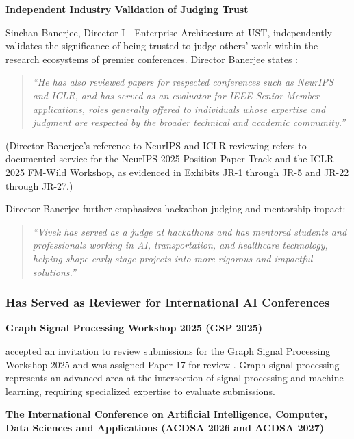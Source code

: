 \textbf{Independent Industry Validation of Judging Trust}

Sinchan Banerjee, Director I - Enterprise Architecture at UST, independently validates the significance of being trusted to judge others' work within the research ecosystems of premier conferences. Director Banerjee states \cite{LOR4}:

\begin{quote}
\textit{``He has also reviewed papers for respected conferences such as NeurIPS and ICLR, and has served as an evaluator for IEEE Senior Member applications, roles generally offered to individuals whose expertise and judgment are respected by the broader technical and academic community.''}
\end{quote}

(Director Banerjee's reference to NeurIPS and ICLR reviewing refers to \drs documented service for the NeurIPS 2025 Position Paper Track and the ICLR 2025 FM-Wild Workshop, as evidenced in Exhibits JR-1 through JR-5 and JR-22 through JR-27.)

Director Banerjee further emphasizes \drs hackathon judging and mentorship impact:

\begin{quote}
\textit{``Vivek has served as a judge at hackathons and has mentored students and professionals working in AI, transportation, and healthcare technology, helping shape early-stage projects into more rigorous and impactful solutions.''}
\end{quote}




\subsubsection{\dr Has Served as Reviewer for International AI Conferences}
\label{judge:conferences}

\textbf{Graph Signal Processing Workshop 2025 (GSP 2025)} 

\dr accepted an invitation to review submissions for the Graph Signal Processing Workshop 2025 \cite{JR6} and was assigned Paper 17 for review \cite{JR7}. Graph signal processing represents an advanced area at the intersection of signal processing and machine learning, requiring specialized expertise to evaluate submissions.

\textbf{The International Conference on Artificial Intelligence, Computer, Data Sciences and Applications (ACDSA 2026 and ACDSA 2027)}

